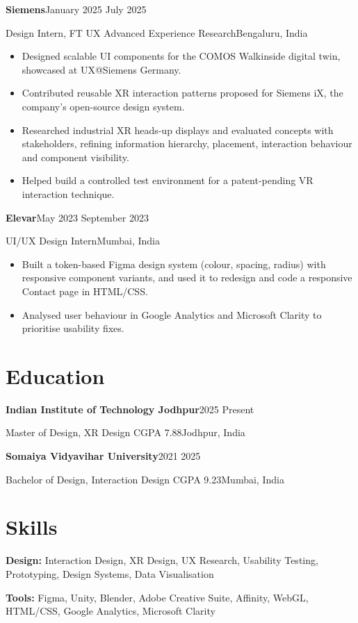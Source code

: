 \documentclass[a4paper,10pt]{article}
\newlength{\entrygap}\setlength{\entrygap}{9pt}
\newcommand{\sep}{\unskip\enspace{\color{rule}\textbar}\enspace\ignorespaces}
\newcommand{\entry}[4]{%
    {\color{ink}\textbf{#1}}\hfill{\color{muted}#2}\par
    {\color{navy}#3}\hfill{\color{muted}#4}\par
}
\begin{document}
\entry{Siemens}{January 2025 \textendash{} July 2025}{Design Intern, FT UX Advanced Experience Research}{Bengaluru, India}
\begin{itemize}
    \item Designed scalable UI components for the COMOS Walkinside digital twin, showcased at UX@Siemens Germany.
    \item Contributed reusable XR interaction patterns proposed for Siemens iX, the company's open-source design system.
    \item Researched industrial XR heads-up displays and evaluated concepts with stakeholders, refining information hierarchy, placement, interaction behaviour and component visibility.
    \item Helped build a controlled test environment for a patent-pending VR interaction technique.
\end{itemize}
\vspace{\entrygap}

\entry{Elevar}{May 2023 \textendash{} September 2023}{UI/UX Design Intern}{Mumbai, India}
\begin{itemize}
    \item Built a token-based Figma design system (colour, spacing, radius) with responsive component variants, and used it to redesign and code a responsive Contact page in HTML/CSS.
    \item Analysed user behaviour in Google Analytics and Microsoft Clarity to prioritise usability fixes.
\end{itemize}

\section{Education}

\entry{Indian Institute of Technology Jodhpur}{2025 \textendash{} Present}{Master of Design, XR Design \sep CGPA 7.88}{Jodhpur, India}
\vspace{\entrygap}

\entry{Somaiya Vidyavihar University}{2021 \textendash{} 2025}{Bachelor of Design, Interaction Design \sep CGPA 9.23}{Mumbai, India}

\section{Skills}

\textbf{\color{ink}Design:} Interaction Design, XR Design, UX Research, Usability Testing, Prototyping, Design Systems, Data Visualisation\par
\vspace{4pt}
\textbf{\color{ink}Tools:} Figma, Unity, Blender, Adobe Creative Suite, Affinity, WebGL, HTML/CSS, Google Analytics, Microsoft Clarity\par
\end{document}
